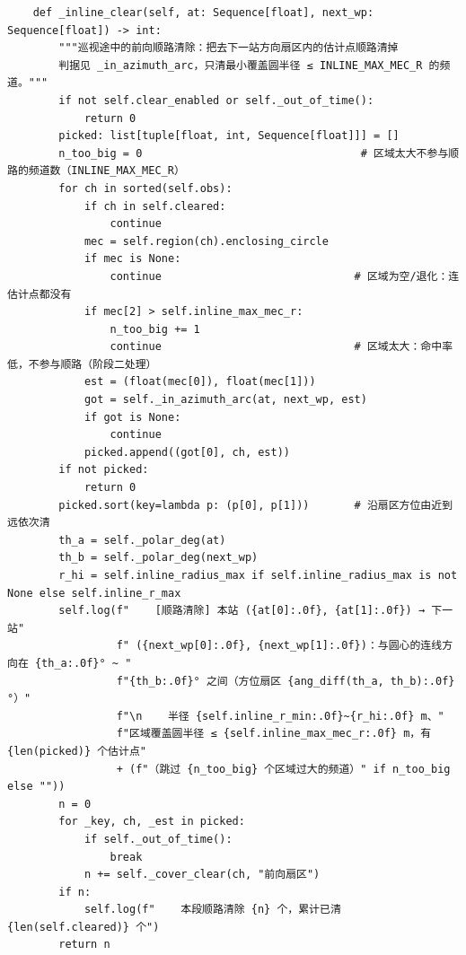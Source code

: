 \documentclass[UTF8, zihao=5,AutoFakeBold=2]{ctexart}
\begin{document}
\begin{lstlisting}
    def _inline_clear(self, at: Sequence[float], next_wp: Sequence[float]) -> int:
        """巡视途中的前向顺路清除：把去下一站方向扇区内的估计点顺路清掉
        判据见 _in_azimuth_arc，只清最小覆盖圆半径 ≤ INLINE_MAX_MEC_R 的频道。"""
        if not self.clear_enabled or self._out_of_time():
            return 0
        picked: list[tuple[float, int, Sequence[float]]] = []
        n_too_big = 0                                  # 区域太大不参与顺路的频道数（INLINE_MAX_MEC_R）
        for ch in sorted(self.obs):
            if ch in self.cleared:
                continue
            mec = self.region(ch).enclosing_circle
            if mec is None:
                continue                              # 区域为空/退化：连估计点都没有
            if mec[2] > self.inline_max_mec_r:
                n_too_big += 1
                continue                              # 区域太大：命中率低，不参与顺路（阶段二处理）
            est = (float(mec[0]), float(mec[1]))
            got = self._in_azimuth_arc(at, next_wp, est)
            if got is None:
                continue
            picked.append((got[0], ch, est))
        if not picked:
            return 0
        picked.sort(key=lambda p: (p[0], p[1]))       # 沿扇区方位由近到远依次清
        th_a = self._polar_deg(at)
        th_b = self._polar_deg(next_wp)
        r_hi = self.inline_radius_max if self.inline_radius_max is not None else self.inline_r_max
        self.log(f"    [顺路清除] 本站 ({at[0]:.0f}, {at[1]:.0f}) → 下一站"
                 f" ({next_wp[0]:.0f}, {next_wp[1]:.0f})：与圆心的连线方向在 {th_a:.0f}° ~ "
                 f"{th_b:.0f}° 之间（方位扇区 {ang_diff(th_a, th_b):.0f}°）"
                 f"\n    半径 {self.inline_r_min:.0f}~{r_hi:.0f} m、"
                 f"区域覆盖圆半径 ≤ {self.inline_max_mec_r:.0f} m，有 {len(picked)} 个估计点"
                 + (f"（跳过 {n_too_big} 个区域过大的频道）" if n_too_big else ""))
        n = 0
        for _key, ch, _est in picked:
            if self._out_of_time():
                break
            n += self._cover_clear(ch, "前向扇区")
        if n:
            self.log(f"    本段顺路清除 {n} 个，累计已清 {len(self.cleared)} 个")
        return n


\end{lstlisting}
\end{document}
